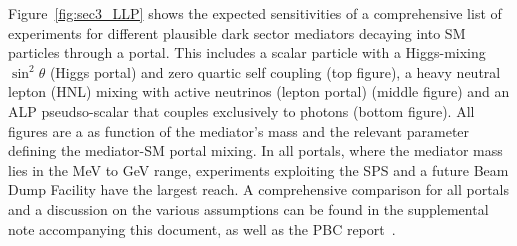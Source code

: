 \documentclass[../report.tex]{subfiles}
\begin{document}
Figure~\ref{fig:sec3_LLP} shows the expected sensitivities of a comprehensive list of experiments for different plausible dark sector mediators decaying into SM particles through a portal. This includes a scalar particle with a Higgs-mixing $\sin^2 \theta$ (Higgs portal) and zero quartic self coupling (top figure), a heavy neutral lepton (HNL) mixing with active neutrinos (lepton portal) (middle figure) and an ALP pseudso-scalar that couples exclusively to photons (bottom figure). All figures are a as function of the mediator's mass and the relevant parameter defining the mediator-SM portal mixing.
In all portals, where the mediator mass lies in the MeV to GeV range, experiments exploiting the SPS and a future Beam Dump Facility have the largest reach.
A comprehensive comparison for all portals and a discussion on the various assumptions can be found in the supplemental note accompanying this document, as well as the PBC report~\cite{Beacham:2019nyx}. 
\end{document}

